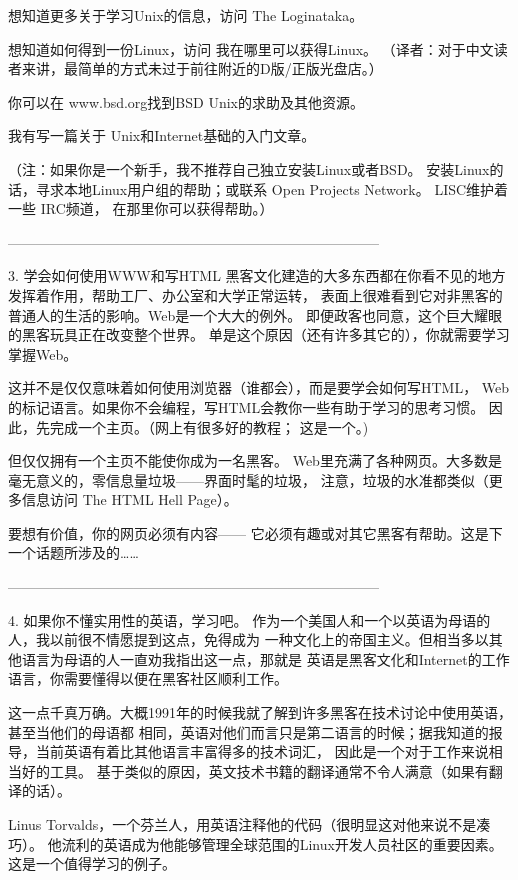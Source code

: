 \documentclass[a4paper,12pt,UTF8,twoside]{ctexbook}
\begin{document}
想知道更多关于学习Unix的信息，访问 The Loginataka。

想知道如何得到一份Linux，访问 我在哪里可以获得Linux。 （译者：对于中文读者来讲，最简单的方式未过于前往附近的D版/正版光盘店。）

你可以在 www.bsd.org找到BSD Unix的求助及其他资源。

我有写一篇关于 Unix和Internet基础的入门文章。

（注：如果你是一个新手，我不推荐自己独立安装Linux或者BSD。 安装Linux的话，寻求本地Linux用户组的帮助；或联系 Open Projects Network。 LISC维护着一些 IRC频道， 在那里你可以获得帮助。）


--------------------------------------------------------------------------------

3. 学会如何使用WWW和写HTML
黑客文化建造的大多东西都在你看不见的地方发挥着作用，帮助工厂、办公室和大学正常运转， 表面上很难看到它对非黑客的普通人的生活的影响。Web是一个大大的例外。 即便政客也同意，这个巨大耀眼的黑客玩具正在改变整个世界。 单是这个原因（还有许多其它的），你就需要学习掌握Web。

这并不是仅仅意味着如何使用浏览器（谁都会），而是要学会如何写HTML， Web的标记语言。如果你不会编程，写HTML会教你一些有助于学习的思考习惯。 因此，先完成一个主页。（网上有很多好的教程； 这是一个。)

但仅仅拥有一个主页不能使你成为一名黑客。 Web里充满了各种网页。大多数是毫无意义的，零信息量垃圾——界面时髦的垃圾， 注意，垃圾的水准都类似（更多信息访问 The HTML Hell Page）。

要想有价值，你的网页必须有内容—— 它必须有趣或对其它黑客有帮助。这是下一个话题所涉及的……


--------------------------------------------------------------------------------

4. 如果你不懂实用性的英语，学习吧。
作为一个美国人和一个以英语为母语的人，我以前很不情愿提到这点，免得成为 一种文化上的帝国主义。但相当多以其他语言为母语的人一直劝我指出这一点，那就是 英语是黑客文化和Internet的工作语言，你需要懂得以便在黑客社区顺利工作。

这一点千真万确。大概1991年的时候我就了解到许多黑客在技术讨论中使用英语，甚至当他们的母语都 相同，英语对他们而言只是第二语言的时候；据我知道的报导，当前英语有着比其他语言丰富得多的技术词汇， 因此是一个对于工作来说相当好的工具。 基于类似的原因，英文技术书籍的翻译通常不令人满意（如果有翻译的话）。

Linus Torvalds，一个芬兰人，用英语注释他的代码（很明显这对他来说不是凑巧）。 他流利的英语成为他能够管理全球范围的Linux开发人员社区的重要因素。 这是一个值得学习的例子。
\end{document}
